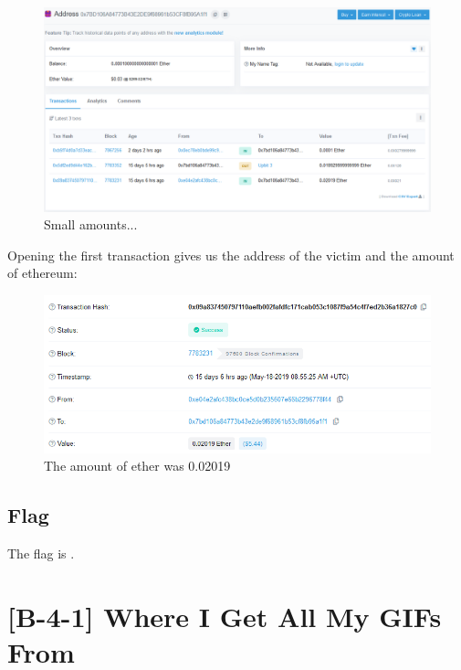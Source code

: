 		\begin{figure}[!htbp]\centering
			\includegraphics[width=130mm]{figures/osintblue/b32a.png} \vspace{5mm}
			\caption{Small amounts...}
		\end{figure}

		Opening the first transaction gives us the address of the victim and the amount of ethereum:

		\begin{figure}[!htbp]\centering
			\includegraphics[width=130mm]{figures/osintblue/b32b.png} \vspace{5mm}
			\caption{The amount of ether was 0.02019}
		\end{figure}


	\subsection{Flag}
		The flag is .


\pagebreak
\section{[B-4-1] Where I Get All My GIFs From}


